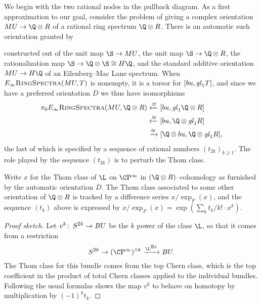 We begin with the two rational nodes in the pullback diagram.  As a first approximation to our goal, consider the problem of giving a complex orientation \(MU \to \Q \otimes R\) of a rational ring spectrum \(\Q \otimes R\).  There is an automatic such orientation granted by
\begin{center}
\end{center}
constructed out of the unit map \(\S \to MU\), the unit map \(\S \to \Q \otimes R\), the rationalization map \(\S \to \Q \otimes \S \cong H\Q\), and the standard additive orientation \(MU \to H\Q\) of an Eilenberg--Mac Lane spectrum.  When \(E_\infty\normalfont\textsc{RingSpectra}(MU, T)\) is nonempty, it is a torsor for \([bu, \mathit{gl}_1 T]\), and since we have a preferred orientation \(D\) we thus have isomorphisms
\begin{align*}
\pi_0 \EinftyRings(MU, \Q \otimes R) & \xleftarrow{\cong} [bu, \gl_1 \Q \otimes R] \\
& \xleftarrow{\cong} [bu, \Q \otimes \gl_1 R] \\
&\xrightarrow{\cong} [\Q \otimes bu, \Q \otimes \gl_1 R],
\end{align*}
the last of which is specified by a sequence of rational numbers \((t_{2k})_{k \ge 1}\).  The role played by the sequence \((t_{2k})\) is to perturb the Thom class.

\begin{lemma}
Write \(x\) for the Thom class of \(\L\) on \(\CP^\infty\) in \((\Q \otimes R)\)--cohomology as furnished by the automatic orientation \(D\).  The Thom class associated to some other orientation of \(\Q \otimes R\) is tracked by a difference series \(x / \exp_F(x)\), and the sequence \((t_k)\) above is expressed by \(x / \exp_F(x) = \exp(\sum_k t_k/k! \cdot x^k)\).
\end{lemma}
\begin{proof}[Proof sketch]
Let \(v^k\colon\thinspace S^{2k} \to BU\) be the \(k\){\th} power of the class \(\L\), so that it comes from a restriction \[S^{2k} \to (\CP^\infty)^{\sm k} \xrightarrow{\L^{\boxtimes k}} BU.\]  The Thom class for this bundle comes from the top Chern class, which is the top coefficient in the product of total Chern classes applied to the individual bundles.  Following the usual formulas shows the map \(v^k\) to behave on homotopy by multiplication by \((-1)^k t_k\).
\end{proof}

